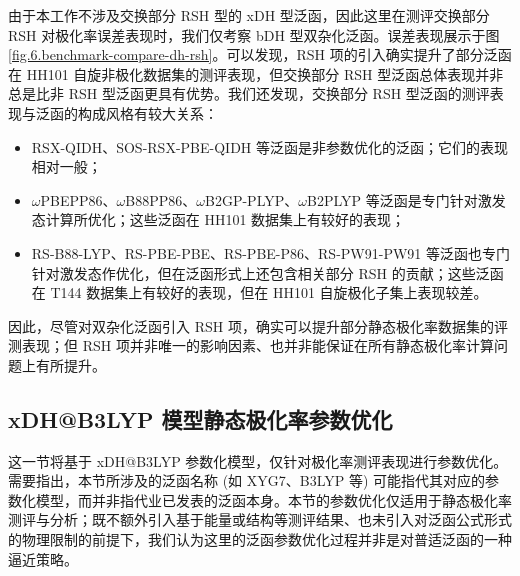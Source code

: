 由于本工作不涉及交换部分 RSH 型的 xDH 型泛函，因此这里在测评交换部分 RSH 对极化率误差表现时，我们仅考察 bDH 型双杂化泛函。误差表现展示于图 \ref{fig.6.benchmark-compare-dh-rsh}。可以发现，RSH 项的引入确实提升了部分泛函在 HH101 自旋非极化数据集的测评表现，但交换部分 RSH 型泛函总体表现并非总是比非 RSH 型泛函更具有优势。我们还发现，交换部分 RSH 型泛函的测评表现与泛函的构成风格有较大关系：
\begin{itemize}[nosep]
    \item RSX-QIDH、SOS-RSX-PBE-QIDH 等泛函是非参数优化的泛函；它们的表现相对一般；
    \item $\omega$PBEPP86、$\omega$B88PP86、$\omega$B2GP-PLYP、$\omega$B2PLYP 等泛函是专门针对激发态计算所优化；这些泛函在 HH101 数据集上有较好的表现；
    \item RS-B88-LYP、RS-PBE-PBE、RS-PBE-P86、RS-PW91-PW91 等泛函也专门针对激发态作优化，但在泛函形式上还包含相关部分 RSH 的贡献；这些泛函在 T144 数据集上有较好的表现，但在 HH101 自旋极化子集上表现较差。
\end{itemize}
因此，尽管对双杂化泛函引入 RSH 项，确实可以提升部分静态极化率数据集的评测表现；但 RSH 项并非唯一的影响因素、也并非能保证在所有静态极化率计算问题上有所提升。

\subsection{xDH@B3LYP 模型静态极化率参数优化}
\label{sec.6.pol-xdh-optimize}

这一节将基于 xDH@B3LYP 参数化模型\cite{Zhang-Xu.JPCL.2021}，仅针对极化率测评表现进行参数优化。需要指出，本节所涉及的泛函名称 (如 XYG7、B3LYP 等) 可能指代其对应的参数化模型，而并非指代业已发表的泛函本身。本节的参数优化仅适用于静态极化率测评与分析；既不额外引入基于能量或结构等测评结果、也未引入对泛函公式形式的物理限制的前提下，我们认为这里的泛函参数优化过程并非是对普适泛函的一种逼近策略。

